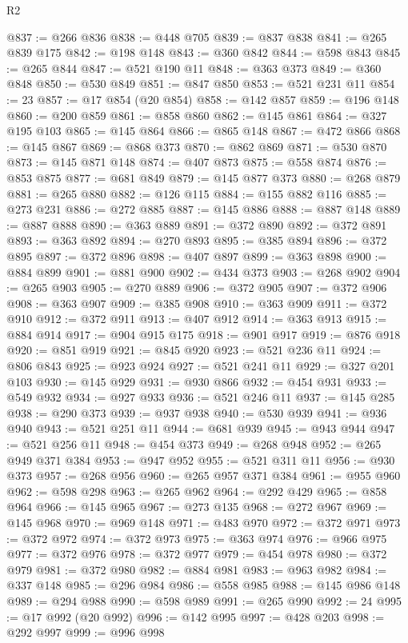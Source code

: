 \begin{lexlean}{R2}
\begin{coremodule}
@837 := @266 @836
@838 := @448 @705
@839 := @837 @838
@841 := @265 @839 @175
@842 := @198 @148
@843 := @360 @842
@844 := @598 @843
@845 := @265 @844
@847 := @521 @190 @11
@848 := @363 @373
@849 := @360 @848
@850 := @530 @849
@851 := @847 @850
@853 := @521 @231 @11
@854 := 23
@857 := @17 @854 (@20 @854)
@858 := @142 @857
@859 := @196 @148
@860 := @200 @859
@861 := @858 @860
@862 := @145 @861
@864 := @327 @195 @103
@865 := @145 @864
@866 := @865 @148
@867 := @472 @866
@868 := @145 @867
@869 := @868 @373
@870 := @862 @869
@871 := @530 @870
@873 := @145 @871 @148
@874 := @407 @873
@875 := @558 @874
@876 := @853 @875
@877 := @681 @849
@879 := @145 @877 @373
@880 := @268 @879
@881 := @265 @880
@882 := @126 @115
@884 := @155 @882 @116
@885 := @273 @231
@886 := @272 @885
@887 := @145 @886
@888 := @887 @148
@889 := @887 @888
@890 := @363 @889
@891 := @372 @890
@892 := @372 @891
@893 := @363 @892
@894 := @270 @893
@895 := @385 @894
@896 := @372 @895
@897 := @372 @896
@898 := @407 @897
@899 := @363 @898
@900 := @884 @899
@901 := @881 @900
@902 := @434 @373
@903 := @268 @902
@904 := @265 @903
@905 := @270 @889
@906 := @372 @905
@907 := @372 @906
@908 := @363 @907
@909 := @385 @908
@910 := @363 @909
@911 := @372 @910
@912 := @372 @911
@913 := @407 @912
@914 := @363 @913
@915 := @884 @914
@917 := @904 @915 @175
@918 := @901 @917
@919 := @876 @918
@920 := @851 @919
@921 := @845 @920
@923 := @521 @236 @11
@924 := @806 @843
@925 := @923 @924
@927 := @521 @241 @11
@929 := @327 @201 @103
@930 := @145 @929
@931 := @930 @866
@932 := @454 @931
@933 := @549 @932
@934 := @927 @933
@936 := @521 @246 @11
@937 := @145 @285
@938 := @290 @373
@939 := @937 @938
@940 := @530 @939
@941 := @936 @940
@943 := @521 @251 @11
@944 := @681 @939
@945 := @943 @944
@947 := @521 @256 @11
@948 := @454 @373
@949 := @268 @948
@952 := @265 @949 @371 @384
@953 := @947 @952
@955 := @521 @311 @11
@956 := @930 @373
@957 := @268 @956
@960 := @265 @957 @371 @384
@961 := @955 @960
@962 := @598 @298
@963 := @265 @962
@964 := @292 @429
@965 := @858 @964
@966 := @145 @965
@967 := @273 @135
@968 := @272 @967
@969 := @145 @968
@970 := @969 @148
@971 := @483 @970
@972 := @372 @971
@973 := @372 @972
@974 := @372 @973
@975 := @363 @974
@976 := @966 @975
@977 := @372 @976
@978 := @372 @977
@979 := @454 @978
@980 := @372 @979
@981 := @372 @980
@982 := @884 @981
@983 := @963 @982
@984 := @337 @148
@985 := @296 @984
@986 := @558 @985
@988 := @145 @986 @148
@989 := @294 @988
@990 := @598 @989
@991 := @265 @990
@992 := 24
@995 := @17 @992 (@20 @992)
@996 := @142 @995
@997 := @428 @203
@998 := @292 @997
@999 := @996 @998

\end{coremodule}
\end{lexlean}

